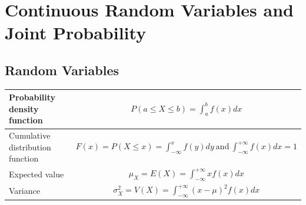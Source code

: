 \documentclass{article}
\begin{document}
\section{Continuous Random Variables and Joint Probability}
\subsection*{Random Variables}
\begin{table}[H]
    \centering
    \begin{tabular}{|l|c|}
    \hline
     \addlinespace[.3ex] Probability density function & $\displaystyle P(a \leq X \leq b) = \int_{a}^{b}f(x)dx$ \\ [.5ex] \hline
    \addlinespace[.3ex] Cumulative distribution function & $\displaystyle F(x) = P(X\leq x) = \int_{-\infty}^{x} f(y)dy \  \text{and} \ \int_{-\infty}^{+\infty} f(x)dx = 1$ \\ [.5ex] \hline
    \addlinespace[.3ex] Expected value & $\displaystyle \mu_{X} = E(X) = \int_{-\infty}^{+\infty} xf(x) dx$ \\ [.5ex] \hline 
    \addlinespace[.3ex] Variance & $\displaystyle \sigma_{X}^{2} = V(X) = \int_{-\infty}^{+\infty} (x-\mu)^{2}f(x) dx$ \\ [.3ex] \hline
    \end{tabular}
\end{table}
\end{document}
